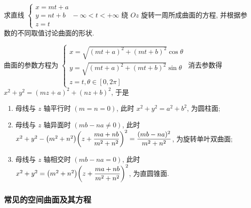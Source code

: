 \begin{example}
    求直线 $\begin{cases}
            x=mt+a \\
            y=nt+b \\
            z=t
        \end{cases}-\infty<t<+\infty$ 绕 $Oz$ 旋转一周所成曲面的方程, 并根据参数的不同取值讨论曲面的形状.
\end{example}
\begin{solution}
    曲面的参数方程为 $\begin{cases}
            x=\sqrt{(mt+a)^2+(mt+b)^2}\cos\theta \\
            y=\sqrt{(mt+a)^2+(mt+b)^2}\sin\theta \\
            z=t,\theta\in[0,2\pi]
        \end{cases}$
    消去参数得 $x^2+y^2=(mz+a)^2+(nz+b)^2$, 于是
    \begin{enumerate}[label=(\arabic{*})]
        \item 母线与 $z$ 轴平行时 $(m=n=0)$, 此时 $x^2+y^2=a^2+b^2$, 为圆柱面;
        \item 母线与 $z$ 轴异面时 $(mb-na\neq0)$, 此时 $x^2+y^2-\qty(m^2+n^2)\qty(z+\dfrac{ma+nb}{m^2+n^2})^2=\dfrac{(mb-na)^2}{m^2+n^2}$, 为旋转单叶双曲面;
        \item 母线与 $z$ 轴相交时 $(mb-na=0)$, 此时 $x^2+y^2=\qty(m^2+n^2)\qty(z+\dfrac{ma+nb}{m^2+n^2})^2$, 为直圆锥面.
    \end{enumerate}
\end{solution}

\subsubsection{常见的空间曲面及其方程}

